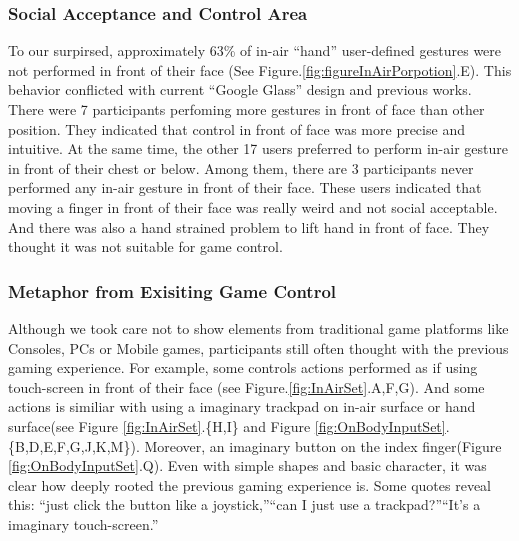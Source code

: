 \documentclass{sigchi}
\begin{document}
    \subsubsection{Social Acceptance and Control Area}
    To our surpirsed, approximately 63\% of in-air ``hand'' user-defined gestures were not performed in front of their face (See Figure.\ref{fig:figureInAirPorpotion}.E). This behavior conflicted with current ``Google Glass'' design and previous works\cite{Colaco:2013:MCL:2501988.2502042}. There were 7 participants perfoming more gestures in front of face than other position. They indicated that control in front of face was more precise and intuitive. At the same time, the other 17 users preferred to perform in-air gesture in front of their chest or below. Among them, there are 3 participants never performed any in-air gesture in front of their face. These users indicated that moving a finger in front of their face was really weird and not social acceptable. And there was also a hand strained problem to lift hand in front of face. They thought it was not suitable for game control.

    \subsubsection{Metaphor from Exisiting Game Control}
    Although we took care not to show elements from traditional game platforms like Consoles, PCs or Mobile games, participants still often thought with the previous gaming experience. For example, some controls actions performed as if using touch-screen in front of their face (see Figure.\ref{fig:InAirSet}.A,F,G). And some actions is similiar with using a imaginary trackpad on in-air surface or hand surface(see Figure \ref{fig:InAirSet}.\{H,I\} and Figure \ref{fig:OnBodyInputSet}.\{B,D,E,F,G,J,K,M\}). Moreover, an imaginary button on the index finger(Figure \ref{fig:OnBodyInputSet}.Q). Even with simple shapes and basic character, it was clear how deeply rooted the previous gaming experience is. Some quotes reveal this: ``just click the button like a joystick,''``can I just use a trackpad?''``It's a imaginary touch-screen.''

\end{document}
